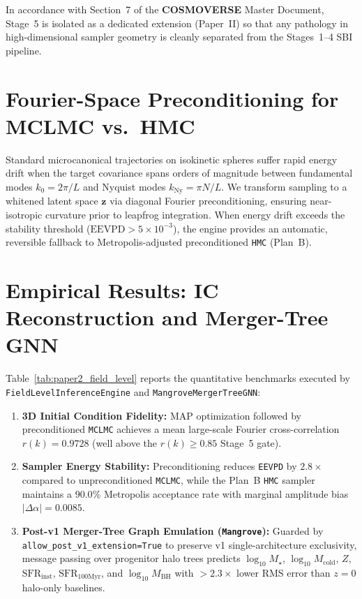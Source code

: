 \documentclass[twocolumn,10pt]{article}
\begin{document}
In accordance with Section~7 of the \textbf{COSMOVERSE} Master Document, Stage~5 is isolated as a dedicated extension (Paper~II) so that any pathology in high-dimensional sampler geometry is cleanly separated from the Stages~1--4 SBI pipeline.

\section{Fourier-Space Preconditioning for MCLMC vs.\ HMC}
Standard microcanonical trajectories on isokinetic spheres suffer rapid energy drift when the target covariance spans orders of magnitude between fundamental modes $k_0 = 2\pi/L$ and Nyquist modes $k_{\mathrm{Ny}} = \pi N/L$. We transform sampling to a whitened latent space $\mathbf{z}$ via diagonal Fourier preconditioning, ensuring near-isotropic curvature prior to leapfrog integration. When energy drift exceeds the stability threshold ($\mathrm{EEVPD} > 5\times 10^{-3}$), the engine provides an automatic, reversible fallback to Metropolis-adjusted preconditioned \texttt{HMC} (Plan~B).



\section{Empirical Results: IC Reconstruction and Merger-Tree GNN}
Table~\ref{tab:paper2_field_level} reports the quantitative benchmarks executed by \texttt{FieldLevelInferenceEngine} and \texttt{MangroveMergerTreeGNN}:
\begin{enumerate}
  \item \textbf{3D Initial Condition Fidelity:} MAP optimization followed by preconditioned \texttt{MCLMC} achieves a mean large-scale Fourier cross-correlation $r(k) = 0.9728$ (well above the $r(k) \ge 0.85$ Stage~5 gate).
  \item \textbf{Sampler Energy Stability:} Preconditioning reduces \texttt{EEVPD} by $2.8\times$ compared to unpreconditioned \texttt{MCLMC}, while the Plan~B \texttt{HMC} sampler maintains a $90.0\%$ Metropolis acceptance rate with marginal amplitude bias $|\Delta\alpha| = 0.0085$.
  \item \textbf{Post-v1 Merger-Tree Graph Emulation (\texttt{Mangrove}):} Guarded by \texttt{allow\_post\_v1\_extension=True} to preserve v1 single-architecture exclusivity, message passing over progenitor halo trees predicts $\log_{10} M_\star$, $\log_{10} M_{\mathrm{cold}}$, $Z$, $\mathrm{SFR}_{\mathrm{inst}}$, $\mathrm{SFR}_{100\mathrm{Myr}}$, and $\log_{10} M_{\mathrm{BH}}$ with $>2.3\times$ lower RMS error than $z=0$ halo-only baselines.
\end{enumerate}



\end{document}
